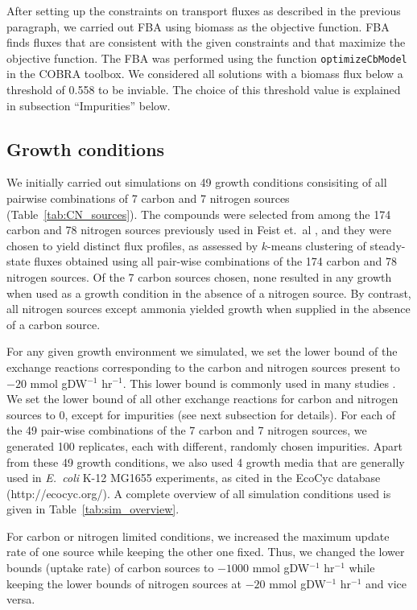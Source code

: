 \documentclass[12pt]{article}
\begin{document}
After setting up the constraints on transport fluxes as described in the previous paragraph, we carried out FBA using biomass as the objective function. FBA finds fluxes that are consistent with the given constraints and that maximize the objective function. The FBA was performed using the function \texttt{optimizeCbModel} in the COBRA toolbox. We considered all solutions with a biomass flux below a threshold of 0.558 to be inviable. The choice of this threshold value is explained in subsection ``Impurities'' below.

\subsection*{Growth conditions} 
We initially carried out simulations on 49 growth conditions consisiting of all pairwise combinations of 7 carbon and 7 nitrogen sources (Table~\ref{tab:CN_sources}). The compounds were selected from among the 174 carbon and 78 nitrogen sources previously used in Feist et.\ al \cite{Feistetal2007}, and they were chosen to yield distinct flux profiles, as assessed by $k$-means clustering of steady-state fluxes obtained using all pair-wise combinations of the 174 carbon and 78 nitrogen sources. Of the 7 carbon sources chosen, none resulted in any growth when used as a growth condition in the absence of a nitrogen source. By contrast, all nitrogen sources except ammonia yielded growth when supplied in the absence of a carbon source.

For any given growth environment we simulated, we set the lower bound of the exchange reactions corresponding to the carbon and nitrogen sources present to $-20$ mmol gDW$^{-1}$ hr$^{-1}$. This lower bound is commonly used in many studies \cite{Feistetal2007}. We set the lower bound of all other exchange reactions for carbon and nitrogen sources to 0, except for impurities (see next subsection for details). For each of the 49 pair-wise combinations of the 7 carbon and 7 nitrogen sources, we generated 100 replicates, each with different, randomly chosen impurities. Apart from these 49 growth conditions, we also used 4 growth media that are generally used in \emph{E.\ coli} K-12 MG1655 experiments, as cited in the EcoCyc database (http://ecocyc.org/). A complete overview of all simulation conditions used is given in Table~\ref{tab:sim_overview}.

For carbon or nitrogen limited conditions, we increased the maximum update rate of one source while keeping the other one fixed. Thus, we changed the lower bounds (uptake rate) of carbon sources to $-1000$ mmol gDW$^{-1}$ hr$^{-1}$ while keeping the lower bounds of nitrogen sources at $-20$ mmol gDW$^{-1}$ hr$^{-1}$ and vice versa. 
\end{document}
